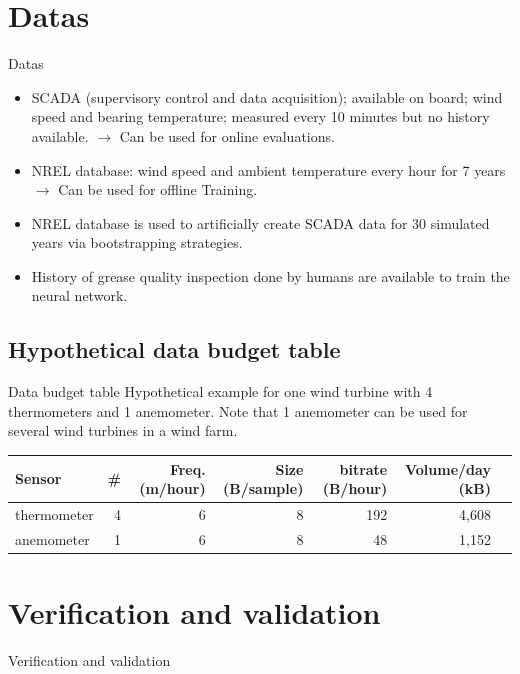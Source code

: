 \documentclass[aspectratio=169,xcolor=dvipsnames]{beamer}
\begin{document}
\section{Datas}
\begin{frame}{Datas}
    \begin{itemize}
        \item SCADA (supervisory control and data acquisition); available on board; wind speed and bearing temperature; measured every 10 minutes but no history available. $\rightarrow$ Can be used for  online evaluations.
        \item NREL database: wind speed and ambient temperature every hour for 7 years $\rightarrow$ Can be used for offline Training.
        \item NREL database is used to artificially create SCADA data for 30 simulated years via bootstrapping strategies.
        \item History of grease quality inspection done by humans are available to train the neural network.
    \end{itemize}
\end{frame}

\subsection{Hypothetical data budget table}
\begin{frame}{Data budget table}
Hypothetical example for one wind turbine with 4 thermometers and 1 anemometer. Note that 1 anemometer can be used for several wind turbines in a wind farm.
\vfill 
\centering
\small
\begin{tabular}{l r r r r r l}
\toprule
Sensor & \# & Freq. (m/hour) & Size (B/sample) & bitrate (B/hour) & Volume/day (kB) \\
\midrule
thermometer  & 4  & 6 & 8       & 192  & 4,608  \\
anemometer   & 1  & 6 & 8       & 48   & 1,152  \\
\bottomrule
\end{tabular}
\end{frame}

\section{Verification and validation}
\begin{frame}{Verification and validation}

\end{frame}
\end{document}

